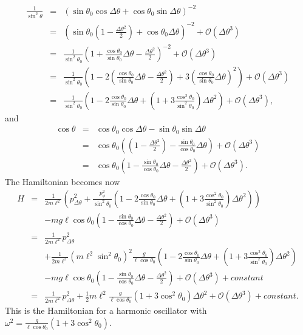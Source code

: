 \documentclass[letterpaper,11pt]{article}
\begin{document}
\begin{eqnarray*}
 \frac{1}{\sin^2\theta} & = & \left( \sin\theta_0 \cos\Delta\theta + \cos\theta_0 \sin\Delta\theta \right)^{-2} \\
 & = & \left( \sin\theta_0 \left(1 - \frac{\Delta\theta^2}{2}\right) + \cos\theta_0 \Delta\theta \right)^{-2} + \mathcal{O}(\Delta\theta^3) \\
 & = & \frac{1}{\sin^2\theta_0} \left( 1 + \frac{\cos\theta_0}{\sin\theta_0} \Delta\theta - \frac{\Delta\theta^2}{2} \right)^{-2}  + \mathcal{O}(\Delta\theta^3) \\
 & = & \frac{1}{\sin^2\theta_0} \left( 1 - 2 \left( \frac{\cos\theta_0}{\sin\theta_0} \Delta\theta - \frac{\Delta\theta^2}{2} \right) + 3 \left( \frac{\cos\theta_0}{\sin\theta_0} \Delta\theta \right)^2 \right) + \mathcal{O}(\Delta\theta^3) \\
 & = & \frac{1}{\sin^2\theta_0} \left( 1 - 2 \frac{\cos\theta_0}{\sin\theta_0} \Delta\theta + \left(1 + 3 \frac{\cos^2\theta_0}{\sin^2\theta_0} \right) \Delta\theta^2 \right) + \mathcal{O}(\Delta\theta^3),
\end{eqnarray*}
and
\begin{eqnarray*}
 \cos\theta & = & \cos\theta_0\cos\Delta\theta - \sin\theta_0\sin\Delta\theta \\
 & = & \cos\theta_0 \left( \left(1 - \frac{\Delta\theta^2}{2} \right) - \frac{\sin\theta_0}{\cos\theta_0} \Delta\theta \right) + \mathcal{O}(\Delta\theta^3) \\
 & = & \cos\theta_0 \left( 1 - \frac{\sin\theta_0}{\cos\theta_0} \Delta\theta - \frac{\Delta\theta^2}{2} \right) + \mathcal{O}(\Delta\theta^3).
\end{eqnarray*}
The Hamiltonian becomes now
\begin{eqnarray*}
 H & = & \frac{1}{2m\ell^2} \left( p_{\Delta\theta}^2 + \frac{p_\phi^2}{\sin^2\theta_0} \left( 1 - 2 \frac{\cos\theta_0}{\sin\theta_0} \Delta\theta + \left(1 + 3 \frac{\cos^2\theta_0}{\sin^2\theta_0} \right) \Delta\theta^2 \right) \right) \\
 & & - mg\ell\cos\theta_0 \left( 1 - \frac{\sin\theta_0}{\cos\theta_0} \Delta\theta - \frac{\Delta\theta^2}{2} \right) + \mathcal{O}(\Delta\theta^3) \\
 & = & \frac{1}{2m\ell^2} p_{\Delta\theta}^2 \\
 & & + \frac{1}{2m\ell^2} \left(m\ell^2\sin^2\theta_0\right)^2 \frac{g}{\ell\cos\theta_0} \left( 1 - 2 \frac{\cos\theta_0}{\sin\theta_0} \Delta\theta + \left(1 + 3 \frac{\cos^2\theta_0}{\sin^2\theta_0} \right) \Delta\theta^2 \right) \\
 & & - mg\ell\cos\theta_0 \left( 1 - \frac{\sin\theta_0}{\cos\theta_0} \Delta\theta - \frac{\Delta\theta^2}{2} \right) + \mathcal{O}(\Delta\theta^3) + constant \\
 & = & \frac{1}{2m\ell^2} p_{\Delta\theta}^2 + \frac{1}{2} m\ell^2 \frac{g}{\ell\cos\theta_0} \left( 1 + 3 \cos^2\theta_0 \right) \Delta\theta^2 + \mathcal{O}(\Delta\theta^3) + constant.
\end{eqnarray*}
This is the Hamiltonian for a harmonic oscillator with $\omega^2 = \frac{g}{\ell\cos\theta_0} \left( 1 + 3 \cos^2\theta_0 \right)$.
\end{document}
